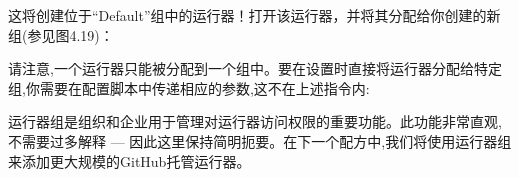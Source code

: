 \begin{enumerate}
这将创建位于“Default”组中的运行器！打开该运行器，并将其分配给你创建的新组(参见图4.19)：


请注意,一个运行器只能被分配到一个组中。要在设置时直接将运行器分配给特定组,你需要在配置脚本中传递相应的参数,这不在上述指令内:


\end{enumerate}

运行器组是组织和企业用于管理对运行器访问权限的重要功能。此功能非常直观,不需要过多解释 --- 因此这里保持简明扼要。在下一个配方中,我们将使用运行器组来添加更大规模的GitHub托管运行器。